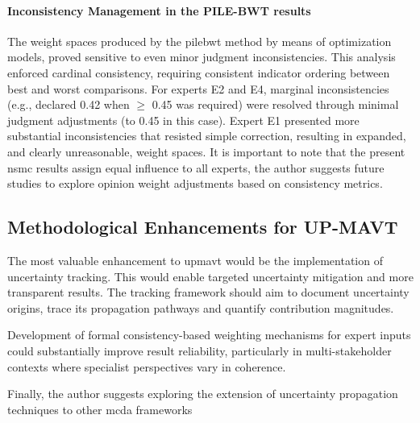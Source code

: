 \paragraph{Inconsistency Management in the PILE-BWT results}
The weight spaces produced by the \gls{pilebwt} method by means of optimization models, proved sensitive to even minor judgment inconsistencies. This analysis enforced cardinal consistency, requiring consistent indicator ordering between best and worst comparisons. For experts E2 and E4, marginal inconsistencies (e.g., declared 0.42 when $\geq$ 0.45 was required) were resolved through minimal judgment adjustments (to 0.45 in this case). Expert E1 presented more substantial inconsistencies that resisted simple correction, resulting in expanded, and clearly unreasonable, weight spaces. It is important to note that the present \gls{nsmc} results assign equal influence to all experts, the author suggests future studies to explore opinion weight adjustments based on consistency metrics.

\subsection{Methodological Enhancements for UP-MAVT}
The most valuable enhancement to \gls{upmavt} would be the implementation of uncertainty tracking. This would enable targeted uncertainty mitigation and more transparent results. The tracking framework should aim to document uncertainty origins, trace its propagation pathways and quantify contribution magnitudes.

Development of formal consistency-based weighting mechanisms for expert inputs could substantially improve result reliability, particularly in multi-stakeholder contexts where specialist perspectives vary in coherence.

Finally, the author suggests exploring the extension of uncertainty propagation techniques to other \gls{mcda} frameworks
